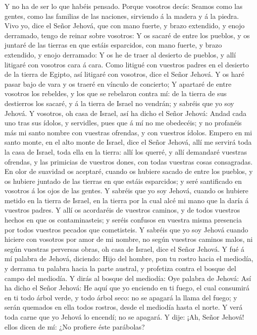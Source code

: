  Y no ha de ser lo que habéis pensado. Porque vosotros
decís: Seamos como las gentes, como las familias de las naciones,
sirviendo á la madera y á la piedra.  Vivo yo, dice el
Señor Jehová, que con mano fuerte, y brazo extendido, y enojo derramado,
tengo de reinar sobre vosotros:  Y os sacaré de entre los
pueblos, y os juntaré de las tierras en que estáis esparcidos, con mano
fuerte, y brazo extendido, y enojo derramado:  Y os he de
traer al desierto de pueblos, y allí litigaré con vosotros cara á cara.
 Como litigué con vuestros padres en el desierto de la
tierra de Egipto, así litigaré con vosotros, dice el Señor Jehová.
 Y os haré pasar bajo de vara y os traeré en vínculo de
concierto;  Y apartaré de entre vosotros los rebeldes, y
los que se rebelaron contra mí: de la tierra de sus destierros los
sacaré, y á la tierra de Israel no vendrán; y sabréis que yo soy Jehová.
 Y vosotros, oh casa de Israel, así ha dicho el Señor
Jehová: Andad cada uno tras sus ídolos, y servidles, pues que á mí no me
obedecéis; y no profanéis más mi santo nombre con vuestras ofrendas, y
con vuestros ídolos.  Empero en mi santo monte, en el alto
monte de Israel, dice el Señor Jehová, allí me servirá toda la casa de
Israel, toda ella en la tierra: allí los querré, y allí demandaré
vuestras ofrendas, y las primicias de vuestros dones, con todas vuestras
cosas consagradas.  En olor de suavidad os aceptaré, cuando
os hubiere sacado de entre los pueblos, y os hubiere juntado de las
tierras en que estáis esparcidos; y seré santificado en vosotros á los
ojos de las gentes.  Y sabréis que yo soy Jehová, cuando os
hubiere metido en la tierra de Israel, en la tierra por la cual alcé mi
mano que la daría á vuestros padres.  Y allí os acordaréis
de vuestros caminos, y de todos vuestros hechos en que os
contaminasteis; y seréis confusos en vuestra misma presencia por todos
vuestros pecados que cometisteis.  Y sabréis que yo soy
Jehová cuando hiciere con vosotros por amor de mi nombre, no según
vuestros caminos malos, ni según vuestras perversas obras, oh casa de
Israel, dice el Señor Jehová.  Y fué á mí palabra de
Jehová, diciendo:  Hijo del hombre, pon tu rostro hacia el
mediodía, y derrama tu palabra hacia la parte austral, y profetiza
contra el bosque del campo del mediodía.  Y dirás al bosque
del mediodía: Oye palabra de Jehová: Así ha dicho el Señor Jehová: He
aquí que yo enciendo en ti fuego, el cual consumirá en ti todo árbol
verde, y todo árbol seco: no se apagará la llama del fuego; y serán
quemados en ella todos rostros, desde el mediodía hasta el norte.
 Y verá toda carne que yo Jehová lo encendí; no se apagará.
 Y dije: ¡Ah, Señor Jehová! ellos dicen de mí: ¿No profiere
éste parábolas?

